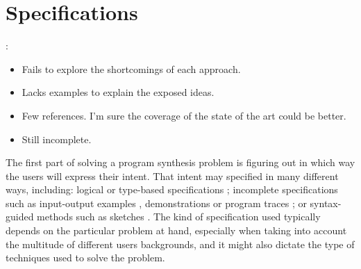 \section{Specifications}
\label{sec:specifications}

:
\begin{itemize}
\item Fails to explore the shortcomings of each approach.
\item Lacks examples to explain the exposed ideas.
\item Few references. I'm sure the coverage of the state of the art could be
  better.
\item Still incomplete.
\end{itemize}

The first part of solving a program synthesis problem is figuring out in which
way the users will express their intent.
That intent may specified in many different ways, including:
  logical \cite{Itzhaky:SIS:2010}
  or type-based specifications \cite{Osera:2015:TPS, Frankle:2016:EST,
    Polikarpova:2016:PSP};
  incomplete specifications such as
  input-output examples \cite{Frankle:2016:EST, Gulwani:2012:SDM, Leung:2015:IPS},
  demonstrations \cite{Lau2003}
  or program traces \cite{Lau:traces:2003};
  or syntax-guided methods such as sketches \cite{Solar-Lezama:2008, Alur:sygus:2013}.
The kind of specification used typically depends on the particular problem at
hand, especially when taking into account the multitude of different users
backgrounds, and it might also dictate the type of techniques used to solve the
problem.




% 


